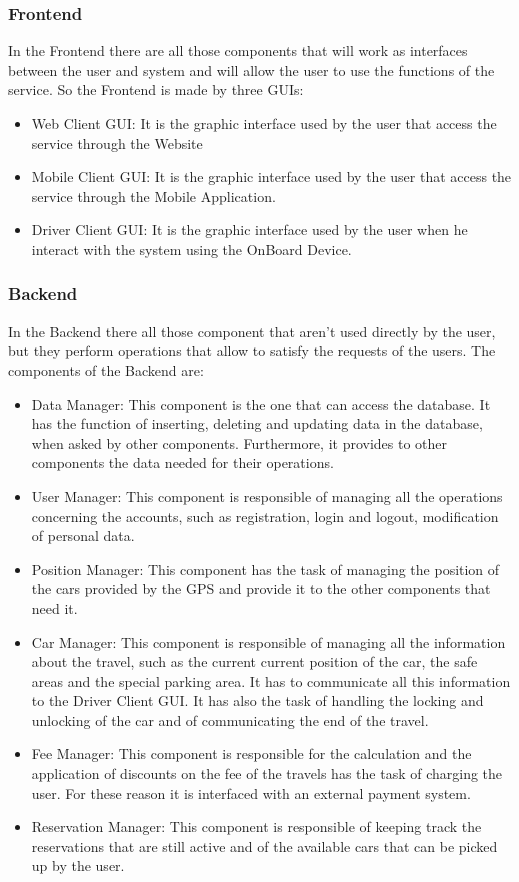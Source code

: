 \subsubsection{Frontend}
In the Frontend there are all those components that will work as interfaces between the user and system and will allow the user to use the functions of the service. So the Frontend is made by three GUIs:
\begin{itemize}
\item Web Client GUI: It is the graphic interface used by the user that access the service through the Website
\item Mobile Client GUI: It is the graphic interface used by the user that access the service through the Mobile Application.
\item Driver Client GUI: It is the graphic interface used by the user when he interact with the system using the OnBoard Device.
\end{itemize}

\subsubsection{Backend}
In the Backend there all those component that aren't used directly by the user, but they perform operations that allow to satisfy the requests of the users. The components of the Backend are:
\begin{itemize}
\item Data Manager: This component is the one that can access the database. It has the function of inserting, deleting and updating data in the database, when asked by other components. Furthermore, it provides to other components the data needed for their operations.
\item User Manager: This component is responsible of managing all the operations concerning the accounts, such as registration, login and logout, modification of personal data.
\item Position Manager: This component has the task of managing the position of the cars provided by the GPS and provide it to the other components that need it. 
\item Car Manager: This component is responsible of managing all the information about the travel, such as the current current position of the car, the safe areas and the special parking area. It has to communicate all this information to the Driver Client GUI. It has also the task of handling the locking and unlocking of the car and of communicating the end of the travel.
\item Fee Manager: This component is responsible for the calculation and the application of discounts on the fee of the travels has the task of charging the user. For these reason it is interfaced with an external payment system.
\item Reservation Manager: This component is responsible of keeping track the reservations that are still active and of the available cars that can be picked up by the user.

\end{itemize}

